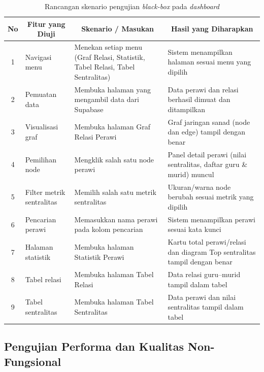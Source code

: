 \begin{table}[H]
\centering
\caption{Rancangan skenario pengujian \textit{black-box} pada \textit{dashboard}}
\label{tab:pengujian}
\renewcommand{\arraystretch}{1.3}
\begin{tabular}{|c|p{2.6cm}|p{4.7cm}|p{4.7cm}|}
\hline
\multicolumn{1}{|c|}{\textbf{No}} & \multicolumn{1}{c|}{\textbf{Fitur yang Diuji}} & \multicolumn{1}{c|}{\textbf{Skenario / Masukan}} & \multicolumn{1}{c|}{\textbf{Hasil yang Diharapkan}} \\
\hline
1 & Navigasi menu & Menekan setiap menu (Graf Relasi, Statistik, Tabel Relasi, Tabel Sentralitas) & Sistem menampilkan halaman sesuai menu yang dipilih \\
\hline
2 & Pemuatan data & Membuka halaman yang mengambil data dari Supabase & Data perawi dan relasi berhasil dimuat dan ditampilkan \\
\hline
3 & Visualisasi graf & Membuka halaman Graf Relasi Perawi & Graf jaringan sanad (node dan edge) tampil dengan benar \\
\hline
4 & Pemilihan node & Mengklik salah satu node perawi & Panel detail perawi (nilai sentralitas, daftar guru \& murid) muncul \\
\hline
5 & Filter metrik sentralitas & Memilih salah satu metrik sentralitas & Ukuran/warna node berubah sesuai metrik yang dipilih \\
\hline
6 & Pencarian perawi & Memasukkan nama perawi pada kolom pencarian & Sistem menampilkan perawi sesuai kata kunci \\
\hline
7 & Halaman statistik & Membuka halaman Statistik Perawi & Kartu total perawi/relasi dan diagram Top sentralitas tampil dengan benar \\
\hline
8 & Tabel relasi & Membuka halaman Tabel Relasi & Data relasi guru--murid tampil dalam tabel \\
\hline
9 & Tabel sentralitas & Membuka halaman Tabel Sentralitas & Data perawi dan nilai sentralitas tampil dalam tabel \\
\hline
\end{tabular}
\end{table}

\subsection{Pengujian Performa dan Kualitas Non-Fungsional}
\label{subsec:pengujian-performa}

